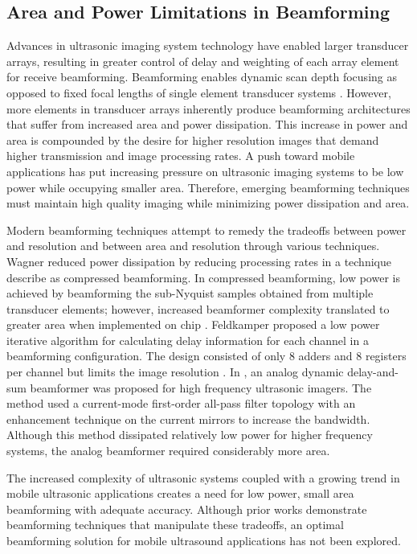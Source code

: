 \documentclass[journal]{IEEEtran}
\begin{document}
\subsection{Area and Power Limitations in Beamforming}

Advances in ultrasonic imaging system technology have enabled larger transducer arrays, resulting in greater control of delay and weighting of each array element for receive beamforming. Beamforming enables dynamic scan depth focusing as opposed to fixed focal lengths of single element transducer systems \cite{Szabo}. However, more elements in transducer arrays inherently produce beamforming architectures that suffer from increased area and power dissipation. This increase in power and area is compounded by the desire for higher resolution images that demand higher transmission and image processing rates. A push toward mobile applications has put increasing pressure on ultrasonic imaging systems to be low power while occupying smaller area. Therefore, emerging beamforming techniques must maintain high quality imaging while minimizing power dissipation and area. 

Modern beamforming techniques attempt to remedy the tradeoffs between power and resolution and between area and resolution through various techniques. Wagner reduced power dissipation by reducing processing rates in a technique describe as compressed beamforming. In compressed beamforming, low power is achieved by beamforming the sub-Nyquist samples obtained from multiple transducer elements; however, increased beamformer complexity translated to greater area when implemented on chip \cite{Wagner}. Feldkamper proposed a low power iterative algorithm for calculating delay information for each channel in a beamforming configuration. The design consisted of only 8 adders and 8 registers per channel but limits the image resolution \cite{feldkamper2000low}. In \cite{gurun2012analog}, an analog dynamic delay-and-sum beamformer was proposed for high frequency ultrasonic imagers. The method used a current-mode first-order all-pass filter topology with an enhancement technique on the current mirrors to increase the bandwidth. Although this method dissipated relatively low power for higher frequency systems, the analog beamformer required considerably more area. 

The increased complexity of ultrasonic systems coupled with a growing trend in mobile ultrasonic applications creates a need for low power, small area beamforming with adequate accuracy. Although prior works demonstrate beamforming techniques that manipulate these tradeoffs, an optimal beamforming solution for mobile ultrasound applications has not been explored. 
\end{document}
